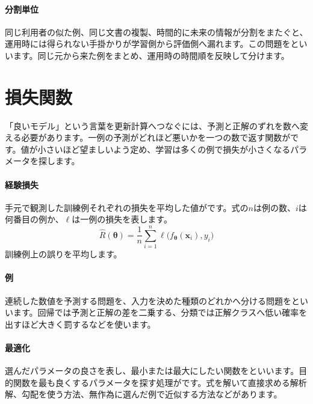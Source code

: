 \paragraph{分割単位}
    同じ利用者の似た例、同じ文書の複製、時間的に未来の情報が分割をまたぐと、運用時には得られない手掛かりが学習側から評価側へ漏れます。この問題をといいます。同じ元から来た例をまとめ、運用時の時間順を反映して分けます。

\par
\endgroup


\section{損失関数}
\label{sec:06-machine-learning-07}

「良いモデル」という言葉を更新計算へつなぐには、予測と正解のずれを数へ変える必要があります。一例の予測がどれほど悪いかを一つの数で返す関数がです。値が小さいほど望ましいよう定め、学習は多くの例で損失が小さくなるパラメータを探します。

\begingroup
\begingroup
\paragraph{経験損失}
        手元で観測した訓練例それぞれの損失を平均した値がです。式の$n$は例の数、$i$は何番目の例か、$\ell$は一例の損失を表します。
        \[
          \hat{R}(\boldsymbol{\theta})=
          \frac{1}{n}\sum_{i=1}^{n}
          \ell\bigl(f_{\boldsymbol{\theta}}(\mathbf{x}_i),y_i\bigr)
        \]
        訓練例上の誤りを平均します。

\paragraph{例}
        連続した数値を予測する問題を、入力を決めた種類のどれかへ分ける問題をといいます。回帰では予測と正解の差を二乗する、分類では正解クラスへ低い確率を出すほど大きく罰するなどを使います。

\par
\endgroup
\medskip
\begingroup
\paragraph{最適化}
        選んだパラメータの良さを表し、最小または最大にしたい関数をといいます。目的関数を最も良くするパラメータを探す処理がです。式を解いて直接求める解析解、勾配を使う方法、無作為に選んだ例で近似する方法などがあります。

